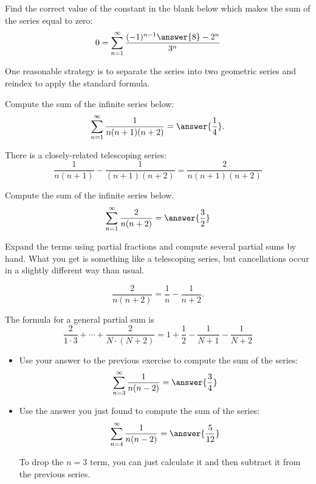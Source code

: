 \documentclass{ximera}
\begin{document}
\begin{exercise}
Find the correct value of the constant in the blank below which makes the sum of the series equal to zero:
\[ 0 = \sum_{n=1}^\infty \frac{(-1)^{n-1}\answer{8} - 2^n}{3^n} \]
\begin{hint} One reasonable strategy is to separate the series into two geometric series and reindex to apply the standard formula. \end{hint}
\end{exercise}

\begin{exercise}
Compute the sum of the infinite series below:
\[ \sum_{n=1}^\infty \frac{1}{n(n+1)(n+2)} = \answer{\frac{1}{4}}. \]
\begin{hint}
There is a closely-related telescoping series:
\[ \frac{1}{n(n+1)} - \frac{1}{(n+1)(n+2)} = \frac{2}{n(n+1)(n+2)} \]
\end{hint}
\end{exercise}

\begin{exercise}
Compute the sum of the infinite series below.
\[ \sum_{n=1}^\infty \frac{2}{n(n+2)} = \answer{\frac{3}{2}} \]
\begin{hint}
Expand the terms using partial fractions and compute several partial sums by hand. What you get is something like a telescoping series, but cancellations occur in a slightly different way than usual.
\begin{hint}
\[ \frac{2}{n(n+2)} = \frac{1}{n} - \frac{1}{n+2}. \]
\begin{hint}
The formula for a general partial sum is
\[ \frac{2}{1 \cdot 3} + \cdots + \frac{2}{N \cdot (N+2)} = 1 + \frac{1}{2} - \frac{1}{N+1} - \frac{1}{N+2} \]
\end{hint}
\end{hint}
\end{hint}
\end{exercise}

\begin{exercise}
\begin{itemize}
\item Use your answer to the previous exercise to compute the sum of the series:
\[ \sum_{n=3}^\infty \frac{1}{n(n-2)} = \answer{\frac{3}{4}} \]
\item Use the answer you just found to compute the sum of the series:
\[ \sum_{n=4}^\infty \frac{1}{n(n-2)} = \answer{\frac{5}{12}} \]
\begin{hint}
To drop the $n=3$ term, you can just calculate it and then subtract it from the previous series.
\end{hint}
\end{itemize}
\end{exercise}
\end{document}
